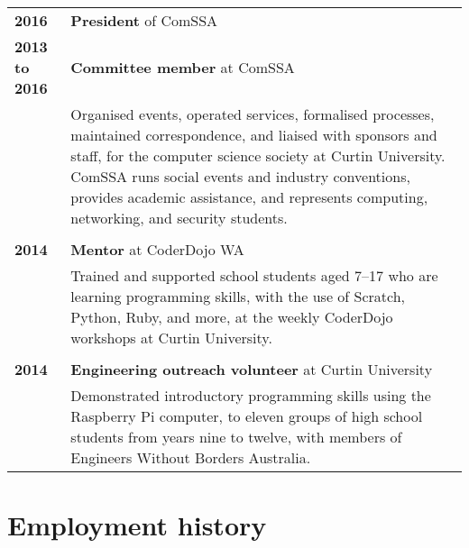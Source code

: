 \documentclass[a4paper,12pt]{article}
\begin{document}
\begin{tabular}{p{35mm}p{125mm}}
	                    \textbf{2016}               & \textbf{President} of ComSSA
	\vspace{0.2em}  \\  \textbf{2013 to 2016}       & \textbf{Committee member} at ComSSA
	\vspace{0.2em}  \\                              & Organised events, operated services, formalised processes, maintained correspondence, and liaised with sponsors and staff, for the computer science society at Curtin University. ComSSA runs social events and industry conventions, provides academic assistance, and represents computing, networking, and security students.
	\\              \\  \textbf{2014}               & \textbf{Mentor} at CoderDojo WA
	\vspace{0.2em}  \\                              & Trained and supported school students aged 7--17 who are learning programming skills, with the use of Scratch, Python, Ruby, and more, at the weekly CoderDojo workshops at Curtin University.
	\\              \\  \textbf{2014}               & \textbf{Engineering outreach volunteer} at Curtin University
	\vspace{0.2em}  \\                              & Demonstrated introductory programming skills using the Raspberry Pi computer, to eleven groups of high school students from years nine to twelve, with members of Engineers Without Borders Australia.
\end{tabular}

\section*{Employment history}
\end{document}
